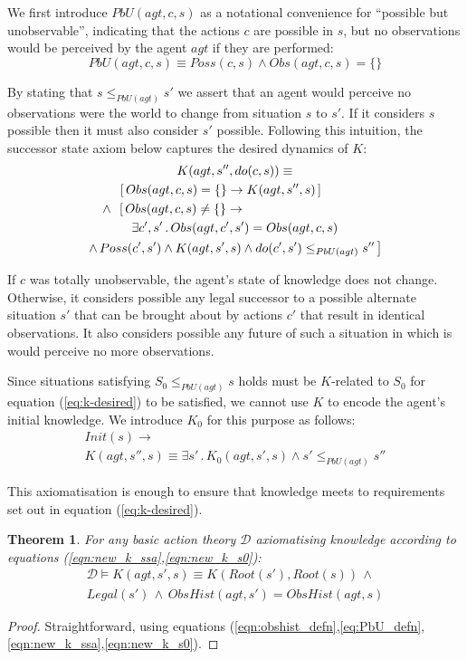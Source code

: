 \documentclass{ifaamas-submission}
\newtheorem{theorem}{Theorem}
\begin{document}
We first introduce $PbU(agt,c,s)$ as a notational convenience for {}``possible
but unobservable'',
indicating that the actions $c$ are possible in $s$, but no observations
would be perceived by the agent $agt$ if they are performed:
\begin{equation}
PbU(agt,c,s)\equiv
Poss(c,s)\wedge Obs(agt,c,s)=\{\}\label{eq:PbU_defn}
\end{equation}

By stating that $s\leq_{PbU(agt)}s'$ we assert that an agent would
perceive no observations were the world to change from situation $s$ to
$s'$. If it considers $s$ possible then it must also consider $s'$ possible.
 Following this intuition, the successor state axiom below
captures the desired dynamics of $K$:
\begin{multline}
K(agt,s'',do(c,s))\equiv\\
\shoveleft{\,\,\,\,\,\,\,\,\,\,\left[\, Obs(agt,c,s)=\{\}\rightarrow K(agt,s'',s)\,\right]}\\
\shoveleft{\,\,\wedge\,\,\,\left[\, Obs(agt,c,s)\neq\{\}\rightarrow\right.}\\
\exists c',s'\,.\, Obs(agt,c',s')=Obs(agt,c,s)\\
\left.\wedge\, Poss(c',s')\wedge K(agt,s',s)\wedge do(c',s')\leq_{PbU(agt)}s''\,\right]\label{eqn:new_k_ssa}
\end{multline}

If $c$ was totally unobservable, the agent's state of knowledge does
not change. Otherwise, it considers possible any legal successor to
a possible alternate situation $s'$ that can be brought about by
actions $c'$ that result in identical observations. It also considers
possible any future of such a situation in which is would perceive no
more observations.

Since situations satisfying
 $S_{0}\leq_{PbU(agt)}s$ holds must be $K$-related to $S_{0}$ for
equation (\ref{eq:k-desired}) to be satisfied, we
cannot use $K$ to encode the agent's initial knowledge.
We introduce $K_{0}$ for this purpose as follows:
\begin{multline}
Init(s)\rightarrow\\
K(agt,s'',s)\equiv \exists s'\,.\, K_{0}(agt,s',s)\wedge s'\leq_{PbU(agt)}s''
\label{eqn:new_k_s0}
\end{multline}

This axiomatisation is enough to ensure that knowledge meets to requirements
set out in equation (\ref{eq:k-desired}).

\begin{theorem}
\label{thm:k_obs_equiv} For any basic action theory $\mathcal{D}$ axiomatising
knowledge according to equations (\ref{eqn:new_k_ssa},\ref{eqn:new_k_s0}):
\begin{multline*}
\mathcal{D}\models K(agt,s',s)\equiv K(Root(s'),Root(s))\,\wedge\\
Legal(s')\,\wedge\, ObsHist(agt,s')=ObsHist(agt,s)
\end{multline*}
\end{theorem}
\begin{proof}
Straightforward, using equations (\ref{eqn:obshist_defn},\ref{eq:PbU_defn},\ref{eqn:new_k_ssa},\ref{eqn:new_k_s0}). 
\end{proof}
\end{document}
